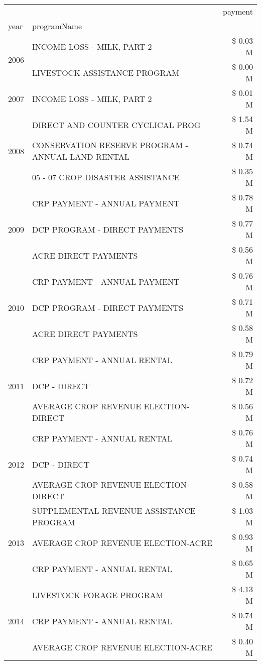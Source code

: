 \begin{tabular}{llr}
\toprule
 &  & payment \\
year & programName &  \\
\midrule
\multirow[t]{2}{*}{2006} & INCOME LOSS - MILK, PART 2 & \$ 0.03 M \\
 & LIVESTOCK ASSISTANCE PROGRAM & \$ 0.00 M \\
\cline{1-3}
2007 & INCOME LOSS - MILK, PART 2 & \$ 0.01 M \\
\cline{1-3}
\multirow[t]{3}{*}{2008} & DIRECT AND COUNTER CYCLICAL PROG & \$ 1.54 M \\
 & CONSERVATION RESERVE PROGRAM - ANNUAL LAND RENTAL & \$ 0.74 M \\
 & 05 - 07 CROP DISASTER ASSISTANCE & \$ 0.35 M \\
\cline{1-3}
\multirow[t]{3}{*}{2009} & CRP PAYMENT - ANNUAL PAYMENT & \$ 0.78 M \\
 & DCP PROGRAM - DIRECT PAYMENTS & \$ 0.77 M \\
 & ACRE DIRECT PAYMENTS & \$ 0.56 M \\
\cline{1-3}
\multirow[t]{3}{*}{2010} & CRP PAYMENT - ANNUAL PAYMENT & \$ 0.76 M \\
 & DCP PROGRAM - DIRECT PAYMENTS & \$ 0.71 M \\
 & ACRE DIRECT PAYMENTS & \$ 0.58 M \\
\cline{1-3}
\multirow[t]{3}{*}{2011} & CRP PAYMENT - ANNUAL RENTAL & \$ 0.79 M \\
 & DCP - DIRECT & \$ 0.72 M \\
 & AVERAGE CROP REVENUE ELECTION-DIRECT & \$ 0.56 M \\
\cline{1-3}
\multirow[t]{3}{*}{2012} & CRP PAYMENT - ANNUAL RENTAL & \$ 0.76 M \\
 & DCP - DIRECT & \$ 0.74 M \\
 & AVERAGE CROP REVENUE ELECTION-DIRECT & \$ 0.58 M \\
\cline{1-3}
\multirow[t]{3}{*}{2013} & SUPPLEMENTAL REVENUE ASSISTANCE PROGRAM & \$ 1.03 M \\
 & AVERAGE CROP REVENUE ELECTION-ACRE & \$ 0.93 M \\
 & CRP PAYMENT - ANNUAL RENTAL & \$ 0.65 M \\
\cline{1-3}
\multirow[t]{3}{*}{2014} & LIVESTOCK FORAGE PROGRAM & \$ 4.13 M \\
 & CRP PAYMENT - ANNUAL RENTAL & \$ 0.74 M \\
 & AVERAGE CROP REVENUE ELECTION-ACRE & \$ 0.40 M \\
\cline{1-3}

\end{tabular}
